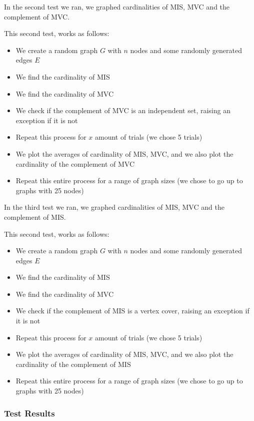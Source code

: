 \documentclass[12pt]{article}
\begin{document}
In the second test we ran, we graphed cardinalities of MIS, MVC and the complement of MVC.

This second test, works as follows:

\begin{itemize}
    \item We create a random graph $G$ with $n$ nodes and some randomly generated edges $E$
    \item We find the cardinality of MIS
    \item We find the cardinality of MVC
    \item We check if the complement of MVC is an independent set, raising an exception if it is not
    \item Repeat this process for $x$ amount of trials (we chose 5 trials)
    \item We plot the averages of cardinality of MIS, MVC, and we also plot the cardinality of the complement of MVC
    \item Repeat this entire process for a range of graph sizes (we chose to go up to graphs with 25 nodes)
\end{itemize}

In the third test we ran, we graphed cardinalities of MIS, MVC and the complement of MIS.

This second test, works as follows:

\begin{itemize}
    \item We create a random graph $G$ with $n$ nodes and some randomly generated edges $E$
    \item We find the cardinality of MIS
    \item We find the cardinality of MVC
    \item We check if the complement of MIS is a vertex cover, raising an exception if it is not
    \item Repeat this process for $x$ amount of trials (we chose 5 trials)
    \item We plot the averages of cardinality of MIS, MVC, and we also plot the cardinality of the complement of MIS
    \item Repeat this entire process for a range of graph sizes (we chose to go up to graphs with 25 nodes)
\end{itemize}


\subsubsection{Test Results}
\end{document}
